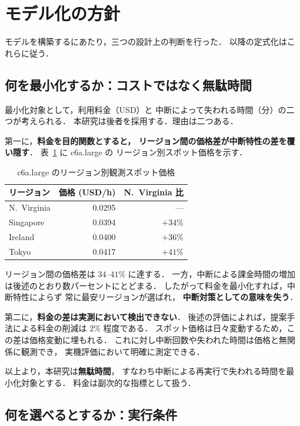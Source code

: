 \documentclass[11pt,a4paper]{ltjsreport}
\begin{document}
\section{モデル化の方針}
\label{sec:model_policy}

モデルを構築するにあたり，三つの設計上の判断を行った．
以降の定式化はこれらに従う．

\subsection{何を最小化するか：コストではなく無駄時間}
\label{sec:why_waste}

最小化対象として，利用料金（USD）と
中断によって失われる時間（分）の二つが考えられる．
本研究は後者を採用する．理由は二つある．

第一に，\textbf{料金を目的関数とすると，
リージョン間の価格差が中断特性の差を覆い隠す}．
表~\ref{tab:price_gap} に c6a.large の
リージョン別スポット価格を示す．

\begin{table}[htbp]
\centering
\caption{c6a.large のリージョン別観測スポット価格}
\label{tab:price_gap}
\small
\begin{tabular}{@{}lrr@{}}
\toprule
リージョン & 価格 (USD/h) & N.~Virginia 比 \\
\midrule
N.~Virginia & 0.0295 & --- \\
Singapore   & 0.0394 & $+34\%$ \\
Ireland     & 0.0400 & $+36\%$ \\
Tokyo       & 0.0417 & $+41\%$ \\
\bottomrule
\end{tabular}
\end{table}

リージョン間の価格差は $34$--$41\%$ に達する．
一方，中断による課金時間の増加は後述のとおり数パーセントにとどまる．
したがって料金を最小化すれば，中断特性によらず
常に最安リージョンが選ばれ，
\textbf{中断対策としての意味を失う}．

第二に，\textbf{料金の差は実測において検出できない}．
後述の評価によれば，提案手法による料金の削減は $2\%$ 程度である．
スポット価格は日々変動するため，この差は価格変動に埋もれる．
これに対し中断回数や失われた時間は価格と無関係に観測でき，
実機評価において明確に測定できる．

以上より，本研究は\textbf{無駄時間}，
すなわち中断による再実行で失われる時間を最小化対象とする．
料金は副次的な指標として扱う．

\subsection{何を選べるとするか：実行条件}
\end{document}
